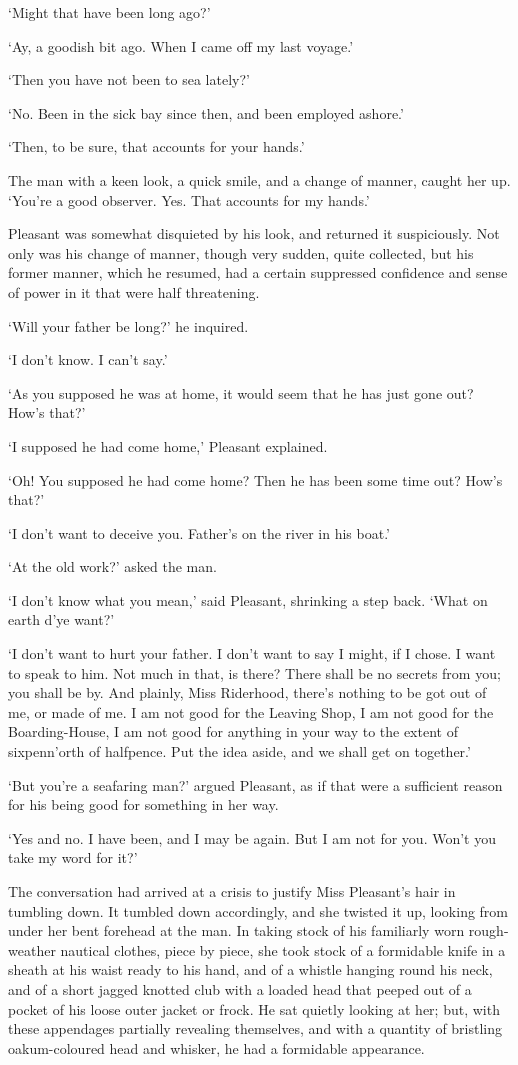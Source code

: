 ‘Might that have been long ago?’

‘Ay, a goodish bit ago. When I came off my last voyage.’

‘Then you have not been to sea lately?’

‘No. Been in the sick bay since then, and been employed ashore.’

‘Then, to be sure, that accounts for your hands.’

The man with a keen look, a quick smile, and a change of manner, caught
her up. ‘You’re a good observer. Yes. That accounts for my hands.’

Pleasant was somewhat disquieted by his look, and returned it
suspiciously. Not only was his change of manner, though very sudden,
quite collected, but his former manner, which he resumed, had a
certain suppressed confidence and sense of power in it that were half
threatening.

‘Will your father be long?’ he inquired.

‘I don’t know. I can’t say.’

‘As you supposed he was at home, it would seem that he has just gone
out? How’s that?’

‘I supposed he had come home,’ Pleasant explained.

‘Oh! You supposed he had come home? Then he has been some time out?
How’s that?’

‘I don’t want to deceive you. Father’s on the river in his boat.’

‘At the old work?’ asked the man.

‘I don’t know what you mean,’ said Pleasant, shrinking a step back.
‘What on earth d’ye want?’

‘I don’t want to hurt your father. I don’t want to say I might, if I
chose. I want to speak to him. Not much in that, is there? There shall
be no secrets from you; you shall be by. And plainly, Miss Riderhood,
there’s nothing to be got out of me, or made of me. I am not good for
the Leaving Shop, I am not good for the Boarding-House, I am not good
for anything in your way to the extent of sixpenn’orth of halfpence. Put
the idea aside, and we shall get on together.’

‘But you’re a seafaring man?’ argued Pleasant, as if that were a
sufficient reason for his being good for something in her way.

‘Yes and no. I have been, and I may be again. But I am not for you.
Won’t you take my word for it?’

The conversation had arrived at a crisis to justify Miss Pleasant’s hair
in tumbling down. It tumbled down accordingly, and she twisted it up,
looking from under her bent forehead at the man. In taking stock of his
familiarly worn rough-weather nautical clothes, piece by piece, she took
stock of a formidable knife in a sheath at his waist ready to his hand,
and of a whistle hanging round his neck, and of a short jagged knotted
club with a loaded head that peeped out of a pocket of his loose
outer jacket or frock. He sat quietly looking at her; but, with these
appendages partially revealing themselves, and with a quantity
of bristling oakum-coloured head and whisker, he had a formidable
appearance.

